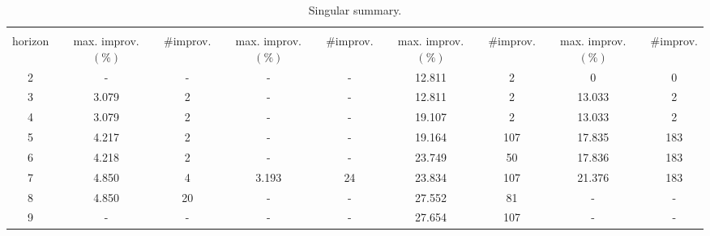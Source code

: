 \begin{table}[t]
	\begin{center}
		\begin{tabular}{|c|c|c|c|c|c|c|c|c|}
			\hline
			 \\
			\hline
			 & \IPMAPIns &  & \CXHIns &  & \ResetIns &  & \LPhaseIns &  \\
			\hline
			horizon & max. improv. $(\%)$ & \#improv. & max. improv. $(\%)$ & \#improv. & max. improv. $(\%)$ & \#improv. & max. improv. $(\%)$ & \#improv. \\
			\hline
			2 & - & - & - & - & 12.811 & 2 & 0 & 0 \\
			\hline
			3 & 3.079 & 2 & - & - & 12.811 & 2 & 13.033 & 2 \\
			\hline
			4 & 3.079 & 2 & - & - & 19.107 & 2 & 13.033 & 2 \\
			\hline
			5 & 4.217 & 2 & - & - & 19.164 & 107 & 17.835 & 183 \\
			\hline
			6 & 4.218 & 2 & - & - & 23.749 & 50 & 17.836 & 183 \\
			\hline
			7 & 4.850 & 4 & 3.193 & 24 & 23.834 & 107 & 21.376 & 183 \\
			\hline
			8 & 4.850 & 20 & - & - & 27.552 & 81 & - & - \\
			\hline
			9 & - & - & - & - & 27.654 & 107 & - & - \\
			\hline
		\end{tabular}
	\end{center}
	\caption{Singular summary.}
	\label{tab:singular_summary}
\end{table}